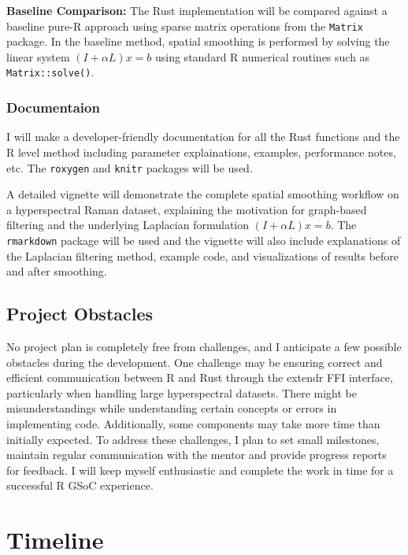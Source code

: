 \documentclass[11pt]{article}
\begin{document}
\textbf{Baseline Comparison:} The Rust implementation will be compared
against a baseline pure-R approach using sparse matrix operations from
the \texttt{Matrix} package. In the baseline method, spatial smoothing
is performed by solving the linear system \((I+αL)x = b\) using standard
R numerical routines such as \texttt{Matrix::solve()}.

\hypertarget{documentaion}{%
\subsubsection{Documentaion}\label{documentaion}}

I will make a developer-friendly documentation for all the Rust
functions and the R level method including parameter explainations,
examples, performance notes, etc. The \texttt{roxygen} and
\texttt{knitr} packages will be used.

A detailed vignette will demonstrate the complete spatial smoothing
workflow on a hyperspectral Raman dataset, explaining the motivation for
graph-based filtering and the underlying Laplacian formulation
\((I+αL)x = b\). The \texttt{rmarkdown} package will be used and the
vignette will also include explanations of the Laplacian filtering
method, example code, and visualizations of results before and after
smoothing.

    \hypertarget{project-obstacles}{%
\subsection{Project Obstacles}\label{project-obstacles}}

No project plan is completely free from challenges, and I anticipate a
few possible obstacles during the development. One challenge may be
ensuring correct and efficient communication between R and Rust through
the extendr FFI interface, particularly when handling large
hyperspectral datasets. There might be misunderstandings while
understanding certain concepts or errors in implementing code.
Additionally, some components may take more time than initially
expected. To address these challenges, I plan to set small milestones,
maintain regular communication with the mentor and provide progress
reports for feedback. I will keep myself enthusiastic and complete the
work in time for a successful R GSoC experience.

    \hypertarget{timeline}{%
\section{Timeline}\label{timeline}}
\end{document}
